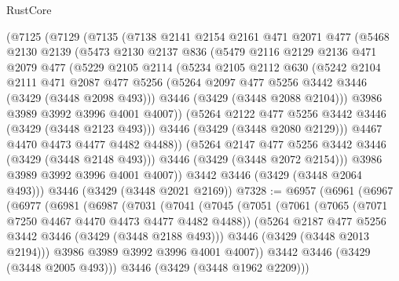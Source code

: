 \begin{lexlean}{RustCore}
\begin{coremodule}
    (@7125
      (@7129
        (@7135
          (@7138
            @2141
            @2154
            @2161
            @471
            @2071
            @477
            (@5468
              @2130
              @2139
              (@5473
                @2130
                @2137
                @836
                (@5479
                  @2116
                  @2129
                  @2136
                  @471
                  @2079
                  @477
                  (@5229
                    @2105
                    @2114
                    (@5234
                      @2105
                      @2112
                      @630
                      (@5242
                        @2104
                        @2111
                        @471
                        @2087
                        @477
                        @5256
                        (@5264 @2097 @477 @5256 @3442 @3446 (@3429 (@3448 @2098 @493)))
                        @3446
                        (@3429 (@3448 @2088 @2104)))
                      @3986
                      @3989
                      @3992
                      @3996
                      @4001
                      @4007))
                  (@5264 @2122 @477 @5256 @3442 @3446 (@3429 (@3448 @2123 @493)))
                  @3446
                  (@3429 (@3448 @2080 @2129)))
                @4467
                @4470
                @4473
                @4477
                @4482
                @4488))
            (@5264 @2147 @477 @5256 @3442 @3446 (@3429 (@3448 @2148 @493)))
            @3446
            (@3429 (@3448 @2072 @2154)))
          @3986
          @3989
          @3992
          @3996
          @4001
          @4007))
      @3442
      @3446
      (@3429 (@3448 @2064 @493)))
    @3446
    (@3429 (@3448 @2021 @2169))
@7328 := @6957
    (@6961
      (@6967
        (@6977
          (@6981
            (@6987
              (@7031
                (@7041
                  (@7045
                    (@7051
                      (@7061
                        (@7065 (@7071 @7250 @4467 @4470 @4473 @4477 @4482 @4488))
                        (@5264 @2187 @477 @5256 @3442 @3446 (@3429 (@3448 @2188 @493)))
                        @3446
                        (@3429 (@3448 @2013 @2194)))
                      @3986
                      @3989
                      @3992
                      @3996
                      @4001
                      @4007))
                  @3442
                  @3446
                  (@3429 (@3448 @2005 @493)))
                @3446
                (@3429 (@3448 @1962 @2209)))

\end{coremodule}
\end{lexlean}
